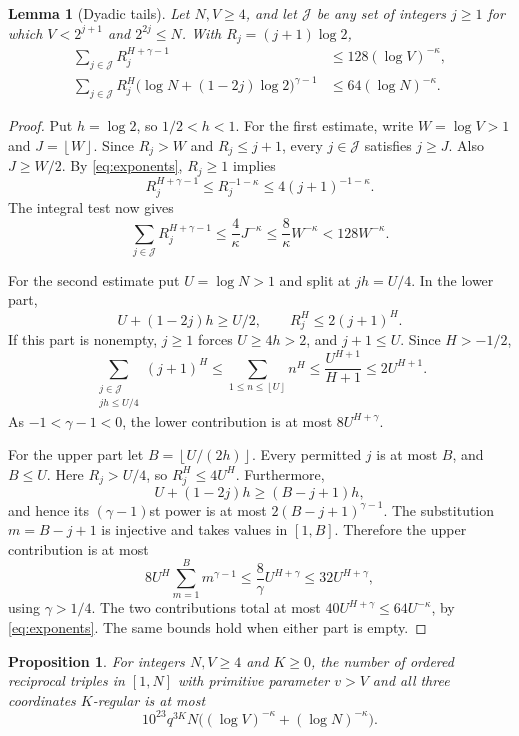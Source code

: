 \documentclass[11pt]{amsart}
\newtheorem{proposition}[theorem]{Proposition}
\newtheorem{lemma}[theorem]{Lemma}
\theoremstyle{definition}
\theoremstyle{remark}
\numberwithin{equation}{section}
\newcommand{\floor}[1]{\left\lfloor #1\right\rfloor}
\begin{document}
\begin{lemma}[Dyadic tails]\label{lem:tails}
Let $N,V\ge4$, and let $\mathcal J$ be any set of integers $j\ge1$ for which
$V<2^{j+1}$ and $2^{2j}\le N$.
With $R_j=(j+1)\log2$,
\begin{align}
\sum_{j\in\mathcal J}R_j^{H+\gamma-1}
&\le128(\log V)^{-\kappa},\label{eq:tailone}\\
\sum_{j\in\mathcal J}R_j^H
\bigl(\log N+(1-2j)\log2\bigr)^{\gamma-1}
&\le64(\log N)^{-\kappa}.\label{eq:tailtwo}
\end{align}
\end{lemma}

\begin{proof}
Put $h=\log2$, so $1/2<h<1$.
For the first estimate, write $W=\log V>1$ and $J=\floor W$.
Since $R_j>W$ and $R_j\le j+1$, every $j\in\mathcal J$ satisfies $j\ge J$.
Also $J\ge W/2$.
By \eqref{eq:exponents}, $R_j\ge1$ implies
\[
R_j^{H+\gamma-1}\le R_j^{-1-\kappa}
\le4(j+1)^{-1-\kappa}.
\]
The integral test now gives
\[
\sum_{j\in\mathcal J}R_j^{H+\gamma-1}
\le\frac4\kappa J^{-\kappa}
\le\frac8\kappa W^{-\kappa}
<128W^{-\kappa}.
\]

For the second estimate put $U=\log N>1$ and split at $jh=U/4$.
In the lower part,
\[
U+(1-2j)h\ge U/2,\qquad R_j^H\le2(j+1)^H.
\]
If this part is nonempty, $j\ge1$ forces $U\ge4h>2$, and $j+1\le U$.
Since $H>-1/2$,
\[
\sum_{\substack{j\in\mathcal J\\jh\le U/4}}(j+1)^H
\le\sum_{1\le n\le\floor U}n^H
\le\frac{U^{H+1}}{H+1}\le2U^{H+1}.
\]
As $-1<\gamma-1<0$, the lower contribution is at most $8U^{H+\gamma}$.

For the upper part let $B=\floor{U/(2h)}$.
Every permitted $j$ is at most $B$, and $B\le U$.
Here $R_j>U/4$, so $R_j^H\le4U^H$.
Furthermore,
\[
U+(1-2j)h\ge(B-j+1)h,
\]
and hence its $(\gamma-1)$st power is at most $2(B-j+1)^{\gamma-1}$.
The substitution $m=B-j+1$ is injective and takes values in $[1,B]$.
Therefore the upper contribution is at most
\[
8U^H\sum_{m=1}^B m^{\gamma-1}
\le\frac8\gamma U^{H+\gamma}
\le32U^{H+\gamma},
\]
using $\gamma>1/4$.
The two contributions total at most $40U^{H+\gamma}\le64U^{-\kappa}$, by \eqref{eq:exponents}.
The same bounds hold when either part is empty.
\end{proof}

\begin{proposition}\label{prop:regularcount}
For integers $N,V\ge4$ and $K\ge0$, the number of ordered reciprocal triples in $[1,N]$ with primitive parameter $v>V$ and all three coordinates $K$-regular is at most
\begin{equation}\label{eq:regularcount}
10^{23}q^{3K}N\bigl((\log V)^{-\kappa}+(\log N)^{-\kappa}\bigr).
\end{equation}
\end{proposition}
\end{document}
